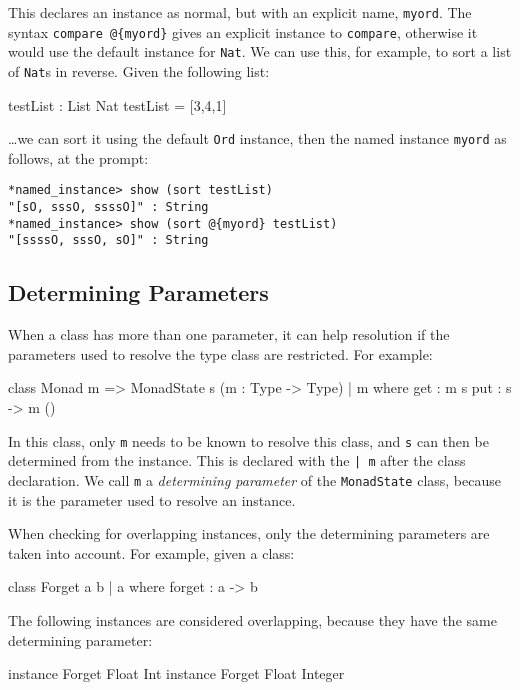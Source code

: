 \noindent
This declares an instance as normal, but with an explicit name, \texttt{myord}.
The syntax \texttt{compare @\{myord\}} gives an explicit instance to \texttt{compare}, otherwise it would use the default instance for \texttt{Nat}.
We can use this, for example, to sort a list of \texttt{Nat}s in reverse.
Given the following list:

\begin{code}
testList : List Nat
testList = [3,4,1]
\end{code}

\noindent
\ldots we can sort it using the default \texttt{Ord} instance, then the named instance \texttt{myord} as follows, at the \Idris{} prompt:

\begin{lstlisting}[style=stdout]
*named_instance> show (sort testList)
"[sO, sssO, ssssO]" : String
*named_instance> show (sort @{myord} testList)
"[ssssO, sssO, sO]" : String
\end{lstlisting}

\subsection{Determining Parameters}

When a class has more than one parameter, it can help resolution if the
parameters used to resolve the type class are restricted. For example:

\begin{code}
class Monad m => MonadState s (m : Type -> Type) | m where
    get : m s
    put : s -> m ()
\end{code}

\noindent
In this class, only \texttt{m} needs to be known to resolve this class, and
\texttt{s} can then be determined from the instance. This is declared
with the \texttt{| m} after the class declaration. We call \texttt{m}
a \emph{determining parameter} of the \texttt{MonadState} class, because it
is the parameter used to resolve an instance. 

When checking for overlapping instances, only the determining parameters
are taken into account. For example, given a class:

\begin{code}
class Forget a b | a where
    forget : a -> b
\end{code}

\noindent
The following instances are considered overlapping, because they have
the same determining parameter:

\begin{code}
instance Forget Float Int
instance Forget Float Integer
\end{code}



